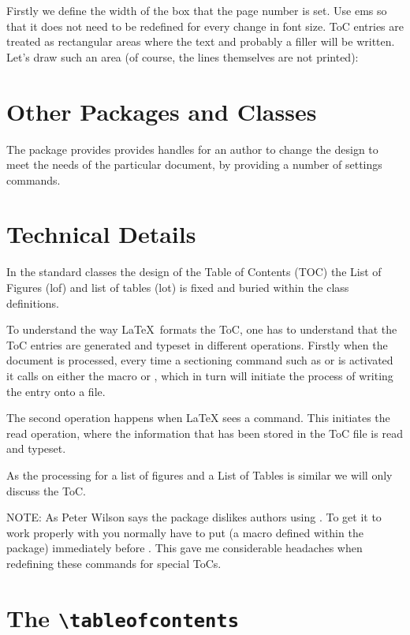 Firstly we define the width of the box that the page number is set. Use ems so that it does not need to be redefined for every change in font size.
ToC entries are treated as rectangular areas where the text
and probably a filler will be written. Let's draw such an
area (of course, the lines themselves are not printed):



\section{Other Packages and Classes}
The package  provides  provides handles for an author to change the design to meet the needs of the particular document, by providing a number of settings commands.



\section{Technical Details}
In the standard classes the design of the Table of Contents (TOC) the List of Figures (lof) and list of tables (lot) is fixed and buried within the class definitions.

To understand the way \LaTeX\ formats the ToC, one has to understand that the ToC entries are generated and typeset in different operations. Firstly when the document is processed, every time a sectioning command such as  or  is activated it calls on either the macro  or , which in turn will initiate the process of writing the entry onto a file.

The second operation happens when LaTeX sees a  command. This initiates the read operation, where the information that has been stored in the ToC file is read and typeset.

As the processing for a list of figures and a List of Tables is similar we will only discuss the ToC.


 NOTE: As Peter Wilson says the  package dislikes authors using
. To get it to work properly with   you normally have to put  (a macro defined within  the  package) immediately  before . This gave me considerable headaches when redefining these commands for special ToCs.


\section{The \texttt{\textbackslash tableofcontents}}

